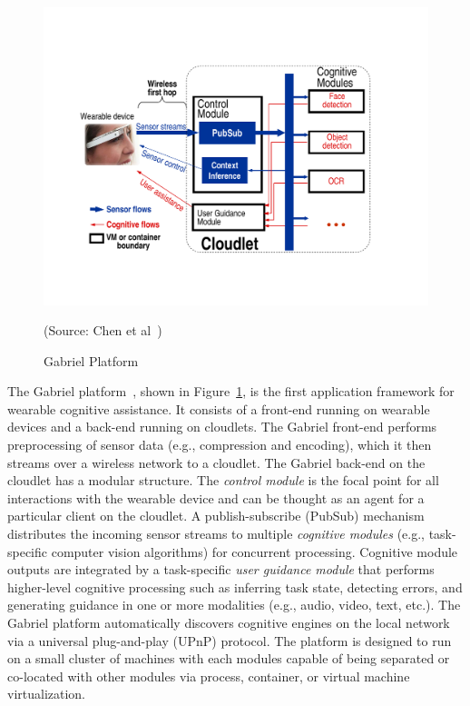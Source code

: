 \begin{figure}
\centering
\includegraphics[width=0.8\linewidth]{FIGS/fig-backend-structure-simple-crop.pdf}
\begin{captiontext}
{\rm (Source: Chen et al~\cite{chen2017empirical})}
\end{captiontext}
\caption{\small Gabriel Platform}
\label{fig:gabriel}
\end{figure}

The Gabriel platform~\cite{ha2014towards,chen2017empirical}, shown in
Figure~\ref{fig:gabriel}, is the first application framework for wearable
cognitive assistance. It consists of a front-end running on wearable devices and
a back-end running on cloudlets. The Gabriel front-end performs preprocessing of
sensor data (e.g., compression and encoding), which it then streams over a
wireless network to a cloudlet.  The Gabriel back-end on the cloudlet has a
modular structure. The {\em control module} is the focal point for all
interactions with the wearable device and can be thought as an agent for a
particular client on the cloudlet. A publish-subscribe (PubSub) mechanism
distributes the incoming sensor streams to multiple {\em cognitive modules}
(e.g., task-specific computer vision algorithms) for concurrent processing.
Cognitive module outputs are integrated by a task-specific {\em user guidance
module} that performs higher-level cognitive processing such as inferring task
state, detecting errors, and generating guidance in one or more modalities
(e.g., audio, video, text, etc.). The Gabriel platform automatically discovers
cognitive engines on the local network via a universal plug-and-play (UPnP)
protocol. The platform is designed to run on a small cluster of machines with
each modules capable of being separated or co-located with other modules via
process, container, or virtual machine virtualization. 

